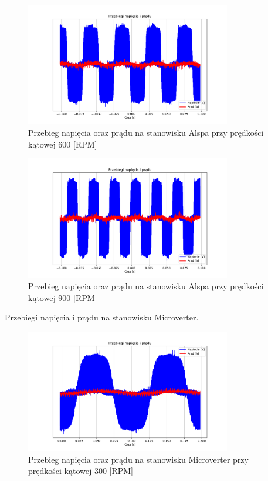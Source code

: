 \documentclass[11pt]{article}
\begin{document}
\begin{figure}[H]
\centering
\includegraphics[width=0.8\textwidth]{aun1_alspa_rpm600.pdf}
\caption{Przebieg napięcia oraz prądu na stanowisku Alspa przy prędkości kątowej 600 [RPM]}
\end{figure}

\begin{figure}[H]
\centering
\includegraphics[width=0.8\textwidth]{aun1_alspa_rpm900.pdf}
\caption{Przebieg napięcia oraz prądu na stanowisku Alspa przy prędkości kątowej 900 [RPM]}
\end{figure}

Przebiegi napięcia i prądu na stanowisku Microverter.\\

\begin{figure}[H]
\centering
\includegraphics[width=0.8\textwidth]{aun1_microverter_rpm300.pdf}
\caption{Przebieg napięcia oraz prądu na stanowisku Microverter przy prędkości kątowej 300 [RPM]}
\end{figure}
\end{document}
